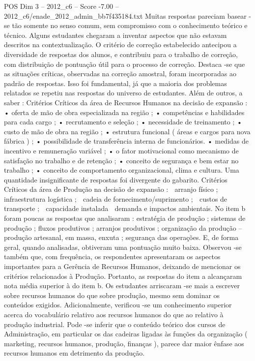 \begin{textsample}{POS Dim 3 – 2012\_c6 – Score -7.00 – 2012\_c6/enade\_2012\_admin\_bb7f435184.txt}
Muitas respostas pareciam basear -se tão somente no senso comum, sem compromisso com o conhecimento teórico e técnico.
Alguns estudantes chegaram a inventar aspectos que não estavam descritos na contextualização.
O critério de correção estabelecido antecipou a diversidade de respostas dos alunos, e contribuiu para o trabalho de correção, com distribuição de pontuação útil para o processo de correção.
Destaca -se que as situações críticas, observadas na correção amostral, foram incorporadas ao padrão de respostas.
Isso foi fundamental, já que a maioria dos problemas relatados se repetiu nas respostas do universo de estudantes.
Além de outros, a saber : Critérios Críticos da área de Recursos Humanos na decisão de expansão : • oferta de mão de obra especializada na região ; • competências e habilidades para cada cargo ; • recrutamento e seleção ; • necessidade de treinamento ; • custo de mão de obra na região ; • estrutura funcional ( áreas e cargos para nova fábrica ) ; • possibilidade de transferência interna de funcionários. • medidas de incentivo e remuneração variável ; • o fator motivacional como mecanismo de satisfação no trabalho e de retenção ; • conceito de segurança e bem estar no trabalho ; • conceito de comportamento organizacional, clima e cultura.
Uma quantidade insignificante de respostas foi divergente do gabarito.
Critérios Críticos da área de Produção na decisão de expansão :  arranjo físico ;  infraestrutura logística ;  cadeia de fornecimento/suprimento ;  custos de transporte ;  capacidade instalada  demanda e impactos ambientais.
No item b foram poucas as respostas que analisaram : estratégia de produção ; sistemas de produção ; fluxos produtivos ; arranjos produtivos ; organização da produção – produção artesanal, em massa, enxuta ; segurança das operações.
E, de forma geral, quando analisadas, obtiveram uma pontuação muito baixa.
Observou -se também que, com frequência, os respondentes apresentaram os aspectos importantes para a Gerência de Recursos Humanos, deixando de mencionar os critérios relacionados à Produção.
Portanto, as respostas do item a alcançaram nota média superior à do item b.
Os estudantes arriscaram -se mais a escrever sobre recursos humanos do que sobre produção, mesmo sem dominar os conteúdos exigidos.
Adicionalmente, verificou -se um conhecimento superior acerca do vocabulário relativo aos recursos humanos do que ao relativo à produção industrial.
Pode -se inferir que o conteúdo teórico dos cursos de Administração, em particular os das cadeiras ligadas às funções da organização ( marketing, recursos humanos, produção, finanças ), parece dar maior ênfase aos recursos humanos em detrimento da produção.

\end{textsample}
